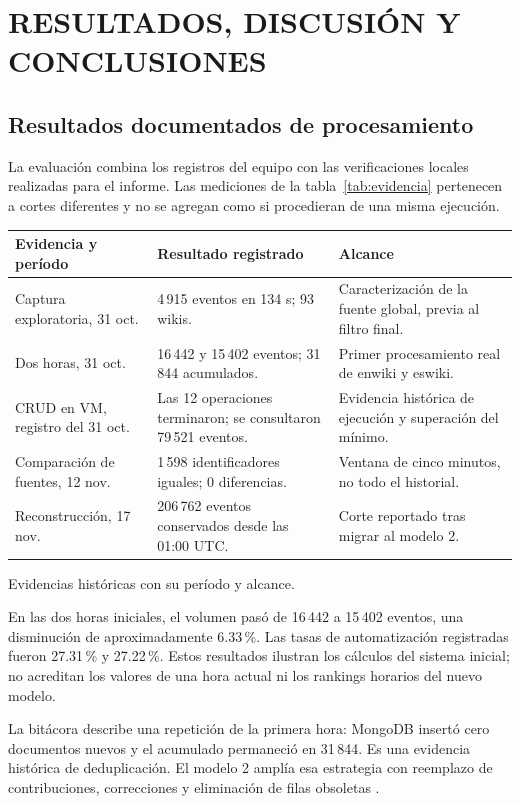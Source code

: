 \chapter{RESULTADOS, DISCUSIÓN Y CONCLUSIONES}
\label{cap:resultados}
\section{Resultados documentados de procesamiento}
La evaluación combina los registros del equipo con las verificaciones locales realizadas para el informe. Las mediciones de la tabla~\ref{tab:evidencia} pertenecen a cortes diferentes y no se agregan como si procedieran de una misma ejecución.

\begin{tabla}
\begin{tabularx}{\textwidth}{P{3.2cm}P{4.0cm}Y}
\toprule
Evidencia y período & Resultado registrado & Alcance \\
\midrule
Captura exploratoria, 31 oct. & 4\,915 eventos en 134 s; 93 wikis. & Caracterización de la fuente global, previa al filtro final. \\
Dos horas, 31 oct. & 16\,442 y 15\,402 eventos; 31\,844 acumulados. & Primer procesamiento real de enwiki y eswiki. \\
CRUD en VM, registro del 31 oct. & Las 12 operaciones terminaron; se consultaron 79\,521 eventos. & Evidencia histórica de ejecución y superación del mínimo. \\
Comparación de fuentes, 12 nov. & 1\,598 identificadores iguales; 0 diferencias. & Ventana de cinco minutos, no todo el historial. \\
Reconstrucción, 17 nov. & 206\,762 eventos conservados desde las 01:00 UTC. & Corte reportado tras migrar al modelo 2. \\
\bottomrule
\end{tabularx}
\caption{Evidencias históricas con su período y alcance.}\label{tab:evidencia}
\end{tabla}

En las dos horas iniciales, el volumen pasó de 16\,442 a 15\,402 eventos, una disminución de aproximadamente 6.33\,\%. Las tasas de automatización registradas fueron 27.31\,\% y 27.22\,\%. Estos resultados ilustran los cálculos del sistema inicial; no acreditan los valores de una hora actual ni los rankings horarios del nuevo modelo.

La bitácora describe una repetición de la primera hora: MongoDB insertó cero documentos nuevos y el acumulado permaneció en 31\,844. Es una evidencia histórica de deduplicación. El modelo 2 amplía esa estrategia con reemplazo de contribuciones, correcciones y eliminación de filas obsoletas \cite{bitacora,correcciones}.

